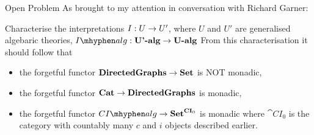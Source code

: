 \begin{frame}{Open Problem}
As brought to my attention in conversation with Richard Garner:

Characterise the interpretations $I: U \rightarrow U'$, where $U$ and $U'$ are generalised algebaric theories,
                       $\Ialg: \cat{U'-alg} \morph \cat{U-alg}$
From this characterisation it should follow that 
\begin{itemize}
\item the forgetful functor $\textbf{DirectedGraphs} \rightarrow \textbf{Set}$ is NOT monadic, 
\item the forgetful functor $\textbf{Cat} \rightarrow \textbf{DirectedGraphs}$ is monadic,
\item the forgetful functor $\CIalg \morph \cat{Set}^{\cat{CI}_0}$ is monadic where $\cat{CI}_0$ is the category with countably many $c$ and $i$
objects described earlier. 
\end{itemize}
\end{frame}
